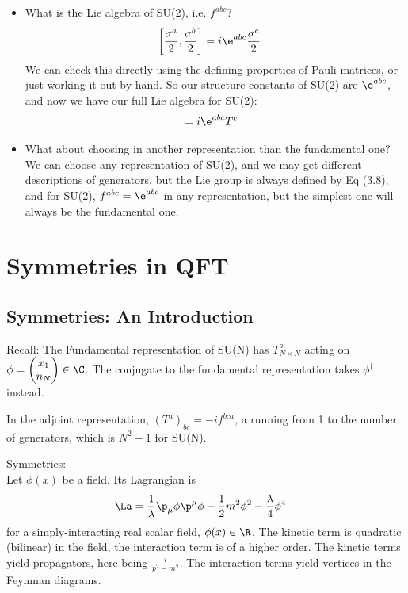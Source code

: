 \documentclass[a4paper, 11pt, normalem]{report}
\begin{document}
\begin{itemize}
    \item What is the Lie algebra of SU(2), i.e. $f^{abc}$?
        \begin{align}
            \left[\frac{\sigma^a}{2},\frac{\sigma^b}{2}\right] &= i\e^{abc}\frac{\sigma^c}{2}
        \end{align}
        We can check this directly using the defining properties of Pauli matrices, or just working it out by hand.
        So our structure constants of SU(2) are $\e^{abc}$, and now we have our full Lie algebra for SU(2):
        \begin{align}
            [T^a,T^b] &= i\e^{abc}T^c
        \end{align}
    \item What about choosing in another representation than the fundamental one?\\
        We can choose any representation of SU(2), and we may get different descriptions of generators, but the Lie group is always defined by Eq (3.8), and for SU(2), $f^{abc} = \e^{abc}$ in any representation, but the simplest one will always be the fundamental one.
\end{itemize}

\chapter{Symmetries in QFT}
\section{Symmetries: An Introduction}
Recall: The Fundamental representation of SU(N) has $T^a_{N\times N}$ acting on $\phi=\begin{pmatrix}x_1\\ n_N\end{pmatrix} \in \C$.
The conjugate to the fundamental representation takes $\phi^\dagger$ instead.

In the adjoint representation, $(T^a)_{bc} = -if^{bca}$, a running from 1 to the number of generators, which is $N^2-1$ for SU(N).

Symmetries:\\
Let $\phi(x)$ be a field.
Its Lagrangian is
\begin{align}
    \La &= \frac{1}{\lambda}\p_\mu\phi\p^\mu\phi - \frac12m^2\phi^2 - \frac{\lambda}{4}\phi^4
\end{align}
for a simply-interacting real scalar field, $\phi(x)\in\R$.
The kinetic term is quadratic (bilinear) in the field, the interaction term is of a higher order.
The kinetic terms yield propagators, here being $\frac{i}{p^2-m^2}$.
The interaction terms yield vertices in the Feynman diagrams.
\end{document}
